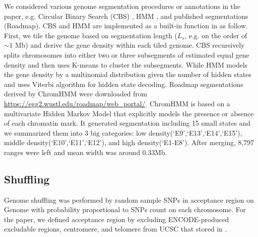 \documentclass{article}
\begin{document}
We considered various genome segmentation procedures or annotations in the paper, e.g. Circular Binary Search (CBS) \citep{cbs}, HMM \citep{rcpphmm}, and published segmentations (Roadmap). CBS and HMM are implemented as a built-in function in \nullranges as follow. First, we tile the genome based on segmentation length ($L_s$, e.g. on the order of ${\sim}1$ Mb) and derive the gene density within each tiled genome. CBS recursively splits chromosomes into either two or three subsegments of estimated equal gene density and then uses K-means to cluster the subsegments. While HMM models the gene density by a multinomial distribution given the number of hidden states and uses Viterbi algorithm for hidden state decoding. Roadmap segmentations derived by ChromHMM \citep{ernst2012chromhmm} were downloaded from \url{https://egg2.wustl.edu/roadmap/web_portal/}. ChromHMM is based on a multivariate Hidden Markov Model that explicitly models the presence or absence of each chromatin mark. It generated segmentation including 15 small states and we summarized them into 3 big categories: low density(`E9',`E13',`E14',`E15'), middle density(`E10',`E11',`E12'), and high density(`E1-E8').
After merging, 8,797 ranges were left and mean width was around 0.33Mb. 

\subsection{Shuffling}\label{sec:shuffle}
Genome shuffling was performed by random sample SNPs in acceptance region on Genome with probability proportional to SNPs count on each chromosome. For the paper, we defined acceptance region by excluding ENCODE-produced excludable regions, centromere, and telomere from UCSC that stored in  \citep{excluderanges}.
\end{document}
